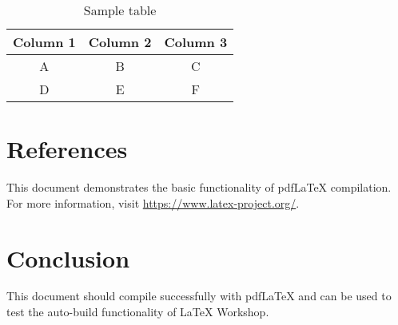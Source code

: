 \documentclass[a4paper,12pt]{article}
\begin{document}
\begin{table}[h]
    \centering
    \begin{tabular}{|c|c|c|}
        \hline
        Column 1 & Column 2 & Column 3 \\
        \hline
        A        & B        & C        \\
        D        & E        & F        \\
        \hline
    \end{tabular}
    \caption{Sample table}
    \label{tab:sample}
\end{table}



\section{References}

This document demonstrates the basic functionality of pdfLaTeX compilation. For more information, visit \url{https://www.latex-project.org/}.




\section{Conclusion}

This document should compile successfully with pdfLaTeX and can be used to test the auto-build functionality of LaTeX Workshop.
\end{document}
